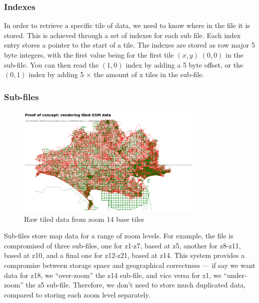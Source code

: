 \documentclass[hyphens]{final_report}
\begin{document}
\subsubsection{Indexes}

In order to retrieve a specific tile of data, we need to know where in the file it is stored. This is achieved through a set of indexes for each sub file. Each index entry stores a pointer to the start of a tile. The indexes are stored as row major 5 byte integers, with the first value being for the first tile \((x,y)\;(0,0)\) in the sub-file. You can then read the \((1,0)\) index by adding a 5 byte offset, or the \((0,1)\) index by adding 5 \(\times{}\) the amount of x tiles in the sub-file.

\subsubsection{Sub-files}

\begin{figure}[ht]
    \centering
    \includegraphics[width=0.8\textwidth]{../proof-of-concepts/4-rendering-osm-data/screenshots/high-detail-at-low-zoom.png}
    \caption{Raw tiled data from zoom 14 base tiles}\label{fig:rendering-tiles}
\end{figure}

Sub-files store map data for a range of zoom levels. For example, the file  is compromised of three sub-files, one for z1-z7, based at z5, another for z8-z11, based at z10, and a final one for z12-z21, based at z14. This system provides a compromise between storage space and geographical correctness --- if say we want data for z18, we ``over-zoom'' the z14 sub-file, and vice versa for z1, we ``under-zoom'' the z5 sub-file. Therefore, we don't need to store much duplicated data, compared to storing each zoom level separately.
\end{document}
